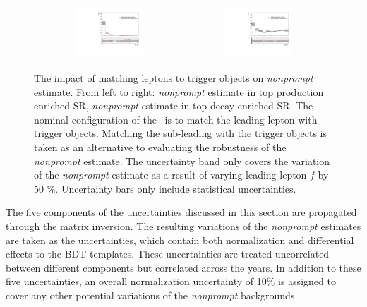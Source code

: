 \begin{figure}[tbh!]
 \begin{center}
 \begin{tabular}{cc}
 \includegraphics[width=0.48\textwidth]{figures/Part3/Systematics/BDT_ST_MM}&
 \includegraphics[width=0.48\textwidth]{figures/Part3/Systematics/BDT_TT_MM} \\
 \end{tabular}
 \caption{The impact of matching leptons to trigger objects on \emph{nonprompt} estimate. From left to right: \emph{nonprompt} estimate in top production enriched \ac{SR}, \emph{nonprompt} estimate in top decay enriched \ac{SR}. The nominal configuration of the \mm~is to match the leading lepton with trigger objects. Matching the sub-leading with the trigger objects is taken as an alternative to evaluating the robustness of the \emph{nonprompt} estimate. The uncertainty band only covers the variation of the \emph{nonprompt} estimate as a result of varying leading lepton $f$ by 50 $\%$. Uncertainty bars only include statistical uncertainties.}
 \label{fig:MM_trigger}
 \end{center}
\end{figure}

The five components of the uncertainties discussed in this section are propagated through the matrix inversion. The resulting variations of the \emph{nonprompt} estimates are taken as the uncertainties, which contain both normalization and differential effects to the \ac{BDT} templates. These uncertainties are treated uncorrelated between different components but correlated across the years. In addition to these five uncertainties, an overall normalization uncertainty of 10$\%$ is assigned to cover any other potential variations of the \emph{nonprompt} backgrounds.

